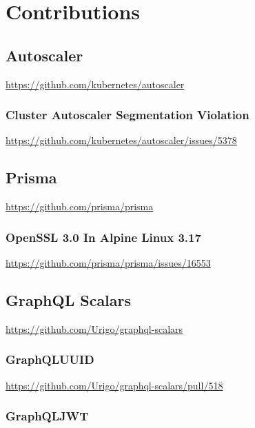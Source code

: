 \chapter{Contributions}
\label{cha:contributions}

\section{Autoscaler}
\label{sec:contributions_autoscaler}

\url{https://github.com/kubernetes/autoscaler}

\subsection{Cluster Autoscaler Segmentation Violation}
\label{subsec:contributions_autoscaler_cluster_autoscaler_segmentation_violation}

\url{https://github.com/kubernetes/autoscaler/issues/5378}

\section{Prisma}
\label{sec:contributions_prisma}

\url{https://github.com/prisma/prisma}

\subsection{OpenSSL 3.0 In Alpine Linux 3.17}
\label{subsec:contributions_prisma_openssl_in_alpine_linux}

\url{https://github.com/prisma/prisma/issues/16553}

\section{GraphQL Scalars}
\label{sec:contributions_graphql_scalars}

\url{https://github.com/Urigo/graphql-scalars}

\subsection{GraphQLUUID}
\label{subsec:contributions_graphql_scalars_graphqluuid}

\url{https://github.com/Urigo/graphql-scalars/pull/518}

\subsection{GraphQLJWT}
\label{subsec:contributions_graphql_scalars_graphqljwt}


